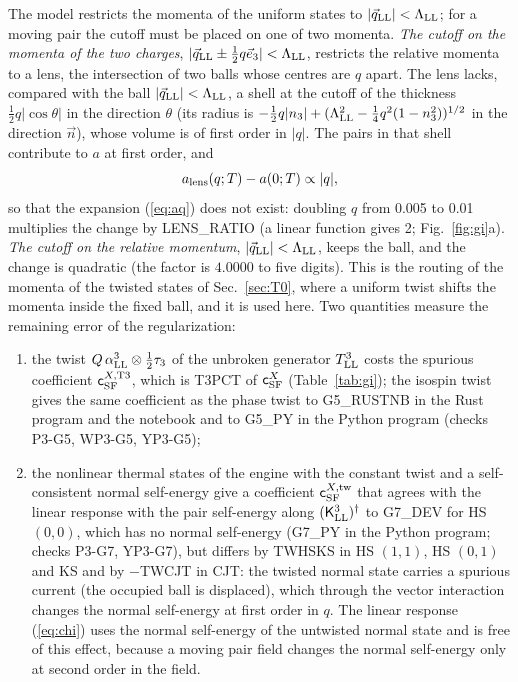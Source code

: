 \documentclass[aps,prd,onecolumn,superscriptaddress,nofootinbib,floatfix,longbibliography]{revtex4-2}
\newcommand{\LL}{{\rm LL}}
\newcommand{\SF}{{\rm SF}}
\begin{document}
The model restricts the momenta of the uniform states to $|\vec q_\LL|<\Lambda_\LL$; for a moving pair the cutoff must be placed on one
of two momenta. \emph{The cutoff on the momenta of the two charges}, $|\vec q_\LL\pm\frac12q\vec e_3|<\Lambda_\LL$, restricts the relative
momenta to a lens, the intersection of two balls whose centres are $q$ apart. The lens lacks, compared with the ball
$|\vec q_\LL|<\Lambda_\LL$, a shell at the cutoff of the thickness $\frac12q|\cos\theta|$ in the direction $\theta$ (its radius is
$-\frac12q|n_3|+(\Lambda_\LL^2-\frac14q^2(1-n_3^2))^{1/2}$ in the direction $\vec n$), whose volume is of first order in $|q|$. The pairs in that shell
contribute to $a$ at first order, and
\begin{equation}
a_{\rm lens}(q;T)-a(0;T)\propto|q|,
\label{eq:lens}
\end{equation}
so that the expansion (\ref{eq:aq}) does not exist: doubling $q$ from 0.005 to 0.01 multiplies the change by {{LENS_RATIO}} (a
linear function gives 2; Fig.~\ref{fig:gi}a). \emph{The cutoff on the relative momentum}, $|\vec q_\LL|<\Lambda_\LL$, keeps the ball, and
the change is quadratic (the factor is $4.0000$ to five digits). This is the routing of the momenta of the twisted states of
Sec.~\ref{sec:T0}, where a uniform twist shifts the momenta inside the fixed ball, and it is used here. Two quantities measure the
remaining error of the regularization:
\begin{enumerate}
\item the twist $Q\,\alpha^3_\LL\otimes\frac12\tau_3$ of the unbroken generator $T^3_\LL$ costs the spurious coefficient $\mathsf c^{X,{\rm T3}}_\SF$, which
is {{T3PCT}} of $\mathsf c^X_\SF$ (Table~\ref{tab:gi}); the isospin twist gives the same coefficient as the phase twist to {{G5_RUSTNB}} in the Rust program and the notebook and to
{{G5_PY}} in the Python program (checks P3-G5, WP3-G5, YP3-G5);
\item the nonlinear thermal states of the engine with the constant twist and a self-consistent normal self-energy give a
coefficient $\mathsf c^{X,{\rm tw}}_\SF$ that agrees with the linear response with the pair self-energy along $(\mathsf K^3_\LL)^\dagger$ to
{{G7_DEV}} for HS $(0,0)$, which has no normal self-energy ({{G7_PY}} in the Python program; checks P3-G7, YP3-G7), but differs by {{TWHSKS}} in HS $(1,1)$, HS $(0,1)$ and KS and by
$-${{TWCJT}} in CJT: the twisted normal state carries a spurious current (the occupied ball is displaced), which through the vector
interaction changes the normal self-energy at first order in $q$. The linear response (\ref{eq:chi}) uses the normal self-energy of
the untwisted normal state and is free of this effect, because a moving pair field changes the normal self-energy only at second
order in the field.
\end{enumerate}
\end{document}
